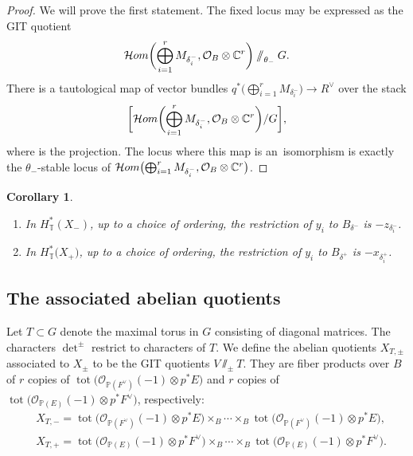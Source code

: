 \documentclass[11pt]{article}
\numberwithin{equation}{section}
\newtheorem{Corollary}[Theorem]{Corollary}
\numberwithin{equation}{section}
\newcommand{\cc}[1]{\mathcal{#1}} %
\newcommand{\CC}{\mathbb{C}}
\newcommand{\PP}{\mathbb{P}}
\newcommand{\torus}{\mathbb{T}}
\DeclareMathOperator{\tot}{tot}
\newcommand{\F}{F}
\newcommand{\E}{E}
\newcommand{\MB}{M}
\newcommand{\z}{z}
\newcommand{\x}{x}
\newcommand{\y}{y}
\begin{document}
\begin{proof}
We will prove the first statement. The fixed locus may be expressed as the GIT quotient
\[
\mathcal{H}{\rm om}\biggl(\bigoplus_{i=1}^r \MB_{\delta^-_i}, \cc O_B \otimes \CC^r\biggr) \sslash_{\theta_{-}} G.
\]
There is a tautological map of vector bundles
$q^*\bigl(\bigoplus_{i=1}^r \MB_{\delta^-_i}\bigr) \to R^\vee$
over the stack
\[
\biggl[\mathcal{H}{\rm om}\biggl(\bigoplus_{i=1}^r \MB_{\delta^-_i}, \cc O_B \otimes \CC^r\biggr) / G\biggr],
\]
where \smash{$q\colon \bigl[\mathcal{H}{\rm om}\bigl(\bigoplus_{i=1}^r \MB_{\delta^-_i}, \cc O_B \otimes \CC^r\bigr) / G\bigr] \to B$} is the projection.
The locus where this map is an~isomorphism is exactly the $\theta_{-}$-stable locus of $\mathcal{H}{\rm om}\bigl( \bigoplus_{i=1}^r \MB_{\delta^-_i}, \cc O_B \otimes \CC^r\bigr)$.
\end{proof}

\begin{Corollary}\label{c:rest}\quad
\begin{enumerate}\itemsep=0pt
\item[$1.$] In $H^*_\torus(X_-)$, up to a choice of ordering, the restriction of $\y_i$ to $B_{\delta^{-}}$ is $-\z_{\delta^{-}_i}$.
\item[$2.$] In $H^*_\torus\bigl(X_+\bigr)$, up to a choice of ordering, the restriction of $\y_i$ to $B_{\delta^{+}}$ is $-\x_{\delta^{+}_i}$.
\end{enumerate}
\end{Corollary}

\subsection{The associated abelian quotients}\label{s:aa}
Let $T \subset G$ denote the maximal torus in $G$ consisting of diagonal matrices. The characters $\det^\pm$ restrict to characters of $T$. We define the abelian quotients $X_{T, \pm}$ associated to $X_\pm$ to be the GIT quotients $V \sslash_\pm T$. They are fiber products over $B$ of $r$ copies of $\tot\bigl(\cc O_{\PP(\F^\vee)}(-1) \otimes p^*\E\bigr)$ and $r$ copies of $\tot\bigl(\cc O_{\PP(\E)}(-1) \otimes p^*\F^\vee\bigr)$, respectively:
\begin{align*}
&X_{T, {-}}= \tot \bigl( \cc O_{\PP(\F^\vee)}(-1) \otimes p^*\E\bigr) \times_B \cdots \times_B \tot \bigl( \cc O_{\PP(\F^\vee)}(-1) \otimes p^*\E\bigr),\\
&X_{T, {+}}= \tot \bigl( \cc O_{\PP(\E)}(-1) \otimes p^*\F^\vee\bigr) \times_B \cdots \times_B \tot \bigl( \cc O_{\PP(\E)}(-1) \otimes p^*\F^\vee\bigr).
\end{align*}
\end{document}
